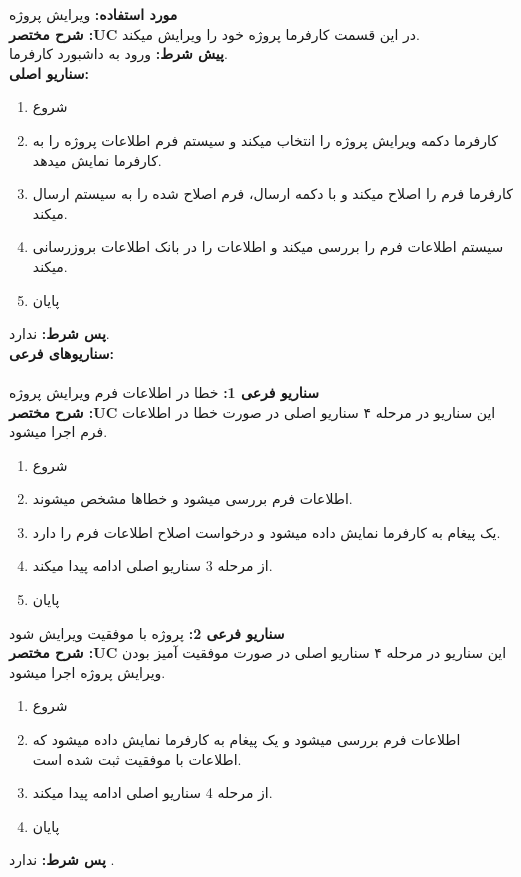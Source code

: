 \documentclass[20pt,a5paper]{report}
\begin{document}
\noindent \textbf{مورد استفاده:}
ویرایش پروژه
\\
\textbf{شرح مختصر :UC}
در این قسمت کارفرما پروژه خود را ویرایش میکند.
\\
\textbf{پيش شرط:}
ورود به داشبورد کارفرما.
\\
\textbf{سناريو اصلی:}
\begin{enumerate}
\item
شروع
\item
کارفرما دکمه ویرایش پروژه را انتخاب میکند و سیستم فرم اطلاعات پروژه را به کارفرما نمایش میدهد.
\item
کارفرما فرم را اصلاح میکند و با دکمه ارسال، فرم اصلاح شده را به سیستم ارسال میکند.
\item
سیستم اطلاعات فرم را بررسی میکند و اطلاعات را در بانک اطلاعات بروزرسانی میکند.
\item
پایان
\end{enumerate}
\textbf{پس شرط:}
ندارد.
\\
\textbf{سناريوهای فرعی:}
\\ \\
\textbf{سناريو فرعی 1:}
خطا در اطلاعات فرم ویرایش پروژه
\\
\textbf{شرح مختصر :UC}
این سناریو در مرحله ۴ سناریو اصلی در صورت خطا در اطلاعات فرم اجرا میشود.
\begin{enumerate}
\item
شروع
\item
اطلاعات فرم بررسی میشود و خطاها مشخص میشوند.
\item
یک پیغام به کارفرما نمایش داده میشود و درخواست اصلاح اطلاعات فرم را دارد.
\item
از مرحله 3 سناریو اصلی ادامه پیدا میکند.
\item
پایان
\end{enumerate}
\textbf{سناريو فرعی 2:}
پروژه با موفقیت ویرایش شود
\\
\textbf{شرح مختصر :UC}
این سناریو در مرحله ۴ سناریو اصلی در صورت موفقیت آمیز بودن ویرایش پروژه اجرا میشود.
\begin{enumerate}
\item
شروع
\item
اطلاعات فرم بررسی میشود و یک پیغام به کارفرما نمایش داده میشود که اطلاعات با موفقیت ثبت شده است.
\item
از مرحله 4 سناریو اصلی ادامه پیدا میکند.
\item
پایان
\end{enumerate}

\textbf{پس شرط:}
ندارد .


\centering
\vfill
\lr{\LaTeX}
\end{document}
